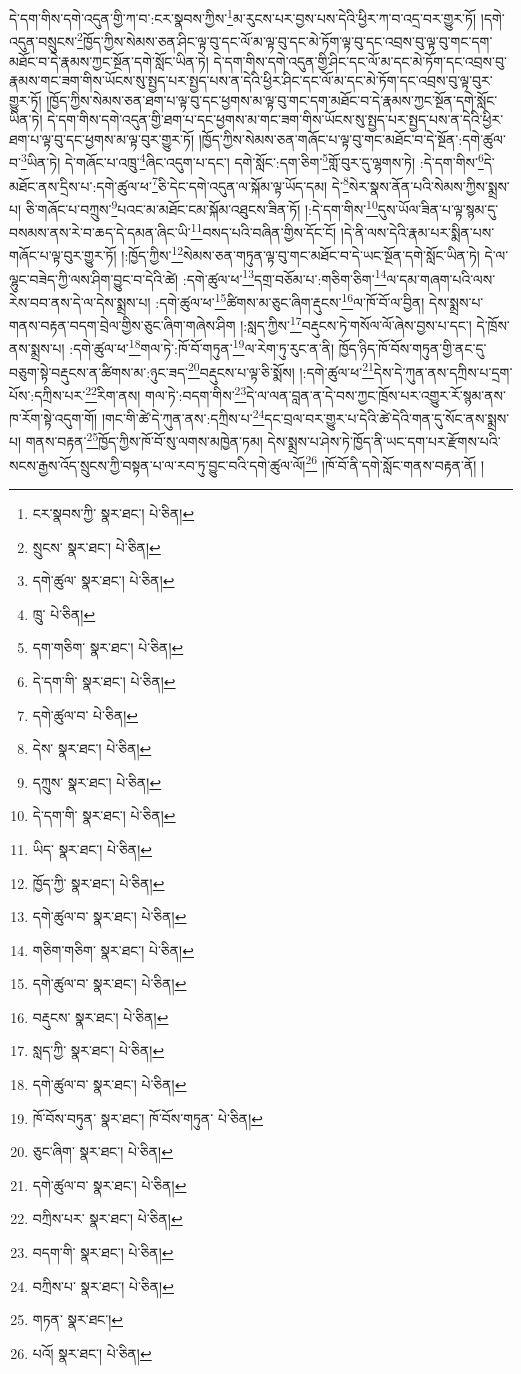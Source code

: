 དེ་དག་གིས་དགེ་འདུན་གྱི་ཀ་བ་:ངར་སྣབས་ཀྱིས་\footnote{ངར་སྣབས་ཀྱི་  སྣར་ཐང་།  པེ་ཅིན། }མ་རུངས་པར་བྱས་པས་དེའི་ཕྱིར་ཀ་བ་འདྲ་བར་གྱུར་ཏོ། །དགེ་འདུན་བསྲུངས་\footnote{སྲུངས་  སྣར་ཐང་།  པེ་ཅིན། }ཁྱོད་ཀྱིས་སེམས་ཅན་ཤིང་ལྟ་བུ་དང་ལོ་མ་ལྟ་བུ་དང་མེ་ཏོག་ལྟ་བུ་དང་འབྲས་བུ་ལྟ་བུ་གང་དག་མཐོང་བ་དེ་རྣམས་ཀྱང་སྔོན་དགེ་སློང་ཡིན་ཏེ། དེ་དག་གིས་དགེ་འདུན་གྱི་ཤིང་དང་ལོ་མ་དང་མེ་ཏོག་དང་འབྲས་བུ་རྣམས་གང་ཟག་གིས་ཡོངས་སུ་སྤྱད་པར་སྤྱད་པས་ན་དེའི་ཕྱིར་ཤིང་དང་ལོ་མ་དང་མེ་ཏོག་དང་འབྲས་བུ་ལྟ་བུར་གྱུར་ཏོ། །ཁྱོད་ཀྱིས་སེམས་ཅན་ཐག་པ་ལྟ་བུ་དང་ཕྱགས་མ་ལྟ་བུ་གང་དག་མཐོང་བ་དེ་རྣམས་ཀྱང་སྔོན་དགེ་སློང་ཡིན་ཏེ། དེ་དག་གིས་དགེ་འདུན་གྱི་ཐག་པ་དང་ཕྱགས་མ་གང་ཟག་གིས་ཡོངས་སུ་སྤྱད་པར་སྤྱད་པས་ན་དེའི་ཕྱིར་ཐག་པ་ལྟ་བུ་དང་ཕྱགས་མ་ལྟ་བུར་གྱུར་ཏོ། །ཁྱོད་ཀྱིས་སེམས་ཅན་གཞོང་པ་ལྟ་བུ་གང་མཐོང་བ་དེ་སྔོན་:དགེ་ཚུལ་བ་\footnote{དགེ་ཚུལ་  སྣར་ཐང་།  པེ་ཅིན། }ཡིན་ཏེ། དེ་གཞོང་པ་འཁྲུ་\footnote{ཁྲུ་  པེ་ཅིན། }ཞིང་འདུག་པ་དང་། དགེ་སློང་:དག་ཅིག་\footnote{དག་གཅིག་  སྣར་ཐང་།  པེ་ཅིན། }གློ་བུར་དུ་ལྷགས་ཏེ། :དེ་དག་གིས་\footnote{དེ་དག་གི་  སྣར་ཐང་།  པེ་ཅིན། }དེ་མཐོང་ནས་དྲིས་པ་:དགེ་ཚུལ་ཕ་\footnote{དགེ་ཚུལ་བ་  པེ་ཅིན། }ཅི་དེང་དགེ་འདུན་ལ་སྐོམ་ལྟ་ཡོད་དམ། དེ་\footnote{དེས་  སྣར་ཐང་།  པེ་ཅིན། }སེར་སྣས་ནོན་པའི་སེམས་ཀྱིས་སྨྲས་པ། ཅི་གཞོང་པ་བཀྲུས་\footnote{དཀྲུས་  སྣར་ཐང་།  པེ་ཅིན། }པའང་མ་མཐོང་ངམ་སྐོམ་འཐུངས་ཟིན་ཏོ། །:དེ་དག་གིས་\footnote{དེ་དག་གི་  སྣར་ཐང་།  པེ་ཅིན། }དུས་ཡོལ་ཟིན་པ་ལྟ་སྙམ་དུ་བསམས་ནས་རེ་བ་ཆད་དེ་དམན་ཞིང་ཡི་\footnote{ཡིད་  སྣར་ཐང་།  པེ་ཅིན། }བསད་པའི་བཞིན་གྱིས་དོང་ངོ། །དེ་ནི་ལས་དེའི་རྣམ་པར་སྨིན་པས་གཞོང་པ་ལྟ་བུར་གྱུར་ཏོ། །:ཁྱོད་ཀྱིས་\footnote{ཁྱོད་ཀྱི་  སྣར་ཐང་།  པེ་ཅིན། }སེམས་ཅན་གཏུན་ལྟ་བུ་གང་མཐོང་བ་དེ་ཡང་སྔོན་དགེ་སློང་ཡིན་ཏེ། དེ་ལ་ལྷུང་བཟེད་ཀྱི་ལས་ཤིག་བྱུང་བ་དེའི་ཚེ། :དགེ་ཚུལ་ཕ་\footnote{དགེ་ཚུལ་བ་  སྣར་ཐང་།  པེ་ཅིན། }དགྲ་བཅོམ་པ་:གཅིག་ཅིག་\footnote{གཅིག་གཅིག་  སྣར་ཐང་།  པེ་ཅིན། }ལ་དམ་གཞག་པའི་ལས་རེས་བབ་ནས་དེ་ལ་དེས་སྨྲས་པ། :དགེ་ཚུལ་ཕ་\footnote{དགེ་ཚུལ་བ་  སྣར་ཐང་།  པེ་ཅིན། }ཚིགས་མ་ཅུང་ཞིག་རྡུངས་\footnote{བརྡུངས་  སྣར་ཐང་།  པེ་ཅིན། }ལ་ཁོ་བོ་ལ་བྱིན། དེས་སྨྲས་པ་གནས་བརྟན་བདག་བྲེལ་གྱིས་ཅུང་ཞིག་གཞེས་ཤིག །:སླད་ཀྱིས་\footnote{སླད་ཀྱི་  སྣར་ཐང་།  པེ་ཅིན། }བརྡུངས་ཏེ་གསོལ་ལོ་ཞེས་བྱས་པ་དང་། དེ་ཁྲོས་ནས་སྨྲས་པ། :དགེ་ཚུལ་ཕ་\footnote{དགེ་ཚུལ་བ་  སྣར་ཐང་།  པེ་ཅིན། }གལ་ཏེ་:ཁོ་བོ་གཏུན་\footnote{ཁོ་བོས་བཏུན་  སྣར་ཐང་། ཁོ་བོས་གཏུན་  པེ་ཅིན། }ལ་རེག་ཏུ་རུང་ན་ནི། ཁྱོད་ཉིད་ཁོ་བོས་གཏུན་གྱི་ནང་དུ་བཅུག་སྟེ་བརྡུངས་ན་ཚིགས་མ་:ཉུང་ཟད་\footnote{ཅུང་ཞིག་  སྣར་ཐང་།  པེ་ཅིན། }བརྡུངས་པ་ལྟ་ཅི་སྨོས། །:དགེ་ཚུལ་ཕ་\footnote{དགེ་ཚུལ་བ་  སྣར་ཐང་།  པེ་ཅིན། }དེས་དེ་ཀུན་ནས་དཀྲིས་པ་དྲག་པོས་:དཀྲིས་པར་\footnote{བཀྲིས་པར་  སྣར་ཐང་།  པེ་ཅིན། }རིག་ནས། གལ་ཏེ་:བདག་གིས་\footnote{བདག་གི་  སྣར་ཐང་།  པེ་ཅིན། }དེ་ལ་ལན་བླན་ན་དེ་བས་ཀྱང་ཁྲོས་པར་འགྱུར་རོ་སྙམ་ནས་ཁ་རོག་སྟེ་འདུག་གོ། །གང་གི་ཚེ་དེ་ཀུན་ནས་:དཀྲིས་པ་\footnote{བཀྲིས་པ་  སྣར་ཐང་།  པེ་ཅིན། }དང་བྲལ་བར་གྱུར་པ་དེའི་ཚེ་དེའི་གན་དུ་སོང་ནས་སྨྲས་པ། གནས་བརྟན་\footnote{གཏན་  སྣར་ཐང་། }ཁྱོད་ཀྱིས་ཁོ་བོ་སུ་ལགས་མཁྱེན་ཏམ། དེས་སྨྲས་པ་ཤེས་ཏེ་ཁྱོད་ནི་ཡང་དག་པར་རྫོགས་པའི་སངས་རྒྱས་འོད་སྲུངས་ཀྱི་བསྟན་པ་ལ་རབ་ཏུ་བྱུང་བའི་དགེ་ཚུལ་ལོ།\footnote{པའོ།  སྣར་ཐང་།  པེ་ཅིན། } །ཁོ་བོ་ནི་དགེ་སློང་གནས་བརྟན་ནོ། །
